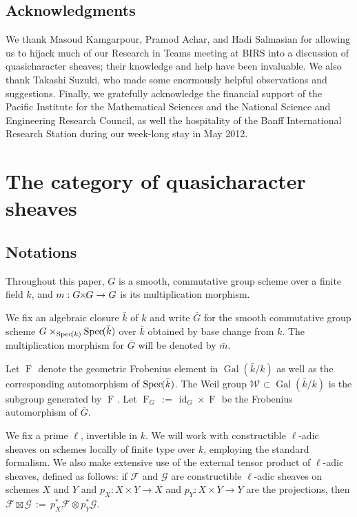 \documentclass{amsart}
\theoremstyle{plain}
\theoremstyle{definition}
\theoremstyle{remark}
\newcommand{\bFq}{\bar{k}}
\newcommand{\Fq}{k}
\newcommand{\Weil}[1]{\mathcal{W}_{#1}}
\DeclareMathOperator{\Gal}{Gal}
\newcommand{\Frob}[1]{\operatorname{F}_{#1}}
\DeclareMathOperator{\id}{id}
\newcommand{\Spec}[1]{{\operatorname{Spec}\hskip-1pt( #1 )}}
\newcommand{\ceq}{{\, :=\, }}
\newcommand{\bm}{\bar{m}}
\newcommand{\bG}{\bar{G}}
\newcommand{\tight}[3]{\hspace{-#1pt}{#2}\hspace{-#3pt}}
\newcommand{\GxG}{\text{$G \tight{1}{\times}{1} G$}}
\begin{document}

\subsection*{Acknowledgments}
We thank Masoud Kamgarpour, Pramod Achar, and Hadi Salmasian
for allowing us to hijack much of our Research in Teams meeting at BIRS into a discussion of
quasicharacter sheaves; their knowledge and help have been invaluable.
We also thank Takashi Suzuki, who made some enormously helpful observations and suggestions.
%
Finally, we gratefully acknowledge the financial support of the Pacific Institute for the Mathematical Sciences
and the National Science and Engineering Research Council,
as well the hospitality of the Banff International Research Station during our week-long stay in May 2012.


\tableofcontents

\section{The category of quasicharacter sheaves}


\subsection{Notations}\label{sec:notation}

Throughout this paper, $G$ is a smooth, commutative group scheme
over a finite field $\Fq$, and $m : \GxG\to G$ is its multiplication morphism.

We fix an algebraic closure $\bFq$ of $\Fq$ and write $\bG$ for the
smooth commutative group scheme $G \times_{\Spec{\Fq}} \Spec{\bFq}$ over $\bFq$
obtained by base change from $k$. The multiplication morphism for $\bG$ will be denoted by $\bm$.

Let $\Frob{}$ denote the geometric Frobenius element in $\Gal(\bFq/\Fq)$ as
well as the corresponding automorphism of $\Spec{\bFq}$. The Weil group
$\Weil{}\subset \Gal(\bFq/\Fq)$ is the subgroup generated by $\Frob{}$.
Let $\Frob{G} \ceq \id_{G} \times \Frob{}$ be the Frobenius automorphism of $\bG$.

We fix a prime $\ell$, invertible in $\Fq$.
We will work with constructible $\ell$-adic sheaves 
on schemes locally of finite type over $\Fq$, employing the standard formalism.
We also make extensive use of the external tensor product of $\ell$-adic sheaves,
defined as follows: if $\mathcal{F}$ and $\mathcal{G}$ are constructible $\ell$-adic
sheaves on schemes $X$ and $Y$ and $p_X : X\times Y\to X$ and $p_Y : X\times Y \to Y$
are the projections, then $\mathcal{F}\boxtimes \mathcal{G} \ceq p_X^* \mathcal{F} \otimes p_Y^*\mathcal{G}$.
\end{document}
